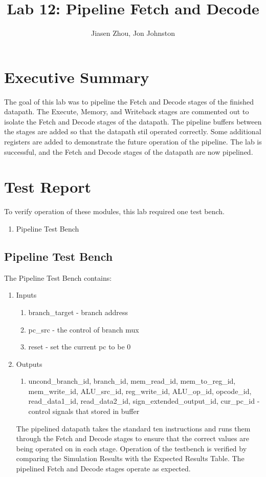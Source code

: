 \documentclass{article}
\author{Jiasen Zhou, Jon Johnston}
\title{Lab 12: Pipeline Fetch and Decode}
\begin{document}
\maketitle

\section{Executive Summary}
The goal of this lab was to pipeline the Fetch and Decode stages of the finished datapath. The Execute, Memory, and Writeback stages are commented out to isolate the Fetch and Decode stages of the datapath. The pipeline buffers between the stages are added so that the datapath stil operated correctly. Some additional registers are added to demonstrate the future operation of the pipeline. The lab is successful, and the Fetch and Decode stages of the datapath are now pipelined.

\section{Test Report}
To verify operation of these modules, this lab required one test bench. 
\begin{enumerate}
	\item Pipeline Test Bench
\end{enumerate}

\subsection{Pipeline Test Bench}
The Pipeline Test Bench contains:
\begin{enumerate}
	\item Inputs
	\begin{enumerate}
		\item branch\_target - branch address
		\item pc\_src - the control of branch mux
		\item reset - set the current pc to be 0
										
	\end{enumerate}	
	\item Outputs
	\begin{enumerate}	
		\item uncond\_branch\_id, branch\_id, mem\_read\_id, mem\_to\_reg\_id, mem\_write\_id, ALU\_src\_id, reg\_write\_id, ALU\_op\_id, opcode\_id, read\_data1\_id, read\_data2\_id, sign\_extended\_output\_id, cur\_pc\_id  - control signals that stored in buffer 
	\end{enumerate}		
		
		The pipelined datapath takes the standard ten instructions and runs them through the Fetch and Decode stages to ensure that the correct values are being operated on in each stage. Operation of the testbench
		is verified by comparing the Simulation Results with the Expected Results Table. The pipelined Fetch and Decode stages operate as expected.

\end{enumerate} 
\end{document}
